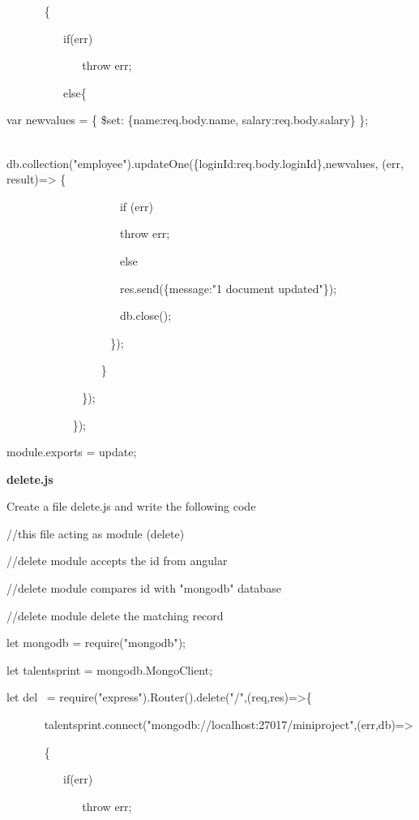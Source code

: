 \documentclass[
]{article}
\begin{document}
{~ ~ ~ ~ }\{

{~ ~ ~ ~ ~ ~ }if(err)

{~ ~ ~ ~ ~ ~ ~ ~ }throw err;

{~ ~ ~ ~ ~ ~ }else\{ {~ ~ ~ ~ ~ ~ ~ ~}

var newvalues = \{ \$set: \{name:req.body.name, salary:req.body.salary\}
\};

{~ ~ ~ ~ ~ ~ ~ ~
}db.collection("employee").updateOne(\{loginId:req.body.loginId\},newvalues,
(err, result)=\textgreater{} \{

{~ ~ ~ ~ ~ ~ ~ ~ ~ ~ ~ ~ }if (err){~}

{~ ~ ~ ~ ~ ~ ~ ~ ~ ~ ~ ~ }throw err;

{~ ~ ~ ~ ~ ~ ~ ~ ~ ~ ~ ~ }else

{~ ~ ~ ~ ~ ~ ~ ~ ~ ~ ~ ~ }res.send(\{message:"1 document updated"\});

{~ ~ ~ ~ ~ ~ ~ ~ ~ ~ ~ ~ }db.close();

{~ ~ ~ ~ ~ ~ ~ ~ ~ ~ ~ }\});

{~ ~ ~ ~ ~ ~ ~ ~ ~ ~ }\}

{~ ~ ~ ~ ~ ~ ~ ~ }\});

{~ ~ ~ ~ ~ ~ ~ }\});

\hfill    

module.exports = update;

\hfill    
\newpage

{\textbf{delete.js}}

Create a file delete.js and write the following code

//this file acting as module (delete)

//delete module accepts the id from angular

//delete module compares id with "mongodb" database

//delete module delete the matching record

\hfill    

let mongodb = require("mongodb");

let talentsprint = mongodb.MongoClient;

\hfill    

let del{~ }=
require("express").Router().delete("/",(req,res)=\textgreater\{

{~ ~ ~ ~
}talentsprint.connect("mongodb://localhost:27017/miniproject",(err,db)=\textgreater{}

{~ ~ ~ ~ }\{

{~ ~ ~ ~ ~ ~ }if(err)

{~ ~ ~ ~ ~ ~ ~ ~ }throw err;
\end{document}
